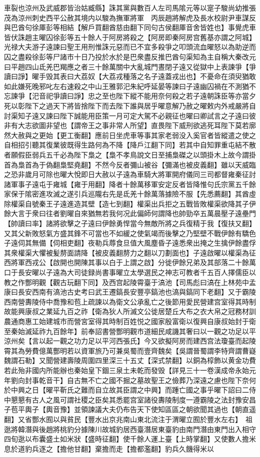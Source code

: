 車裂也涼州及武威郡皆治姑臧縣】誅其黨與數百人左司馬隂元等以寔子駿尚幼推張茂為涼州刺史西平公赦其境内以駿為撫軍將軍　丙辰趙將解虎及長水校尉尹車謀反與巴酋句徐厙彭等相結【解戶買翻酋慈由翻下同句古侯翻厙音舍皆姓也】事覺虎車皆伏誅趙主曜囚徐彭等五十餘人于阿房將殺之【阿房即秦阿房宫舊基亦謂之阿城】光禄大夫游子遠諫曰聖王用刑惟誅元惡而已不宜多殺爭之叩頭流血曜怒以為助逆而囚之盡殺徐彭等尸諸市十日乃投於水於是巴衆盡反推巴酋句渠知為主自稱大秦改元曰平趙四山氐羌巴羯應之者三十餘萬關中大亂城門晝閉子遠又從獄中上表諫爭【爭讀曰諍】曜手毁其表曰大荔奴【大荔戎種落之名子遠蓋戎出也】不憂命在須臾猶敢如此嫌死晚邪叱左右速殺之中山王雅郭汜朱紀呼延晏等諫曰子遠幽囚禍在不測猶不忘諫爭【汜音祀爭讀曰諍】忠之至也陛下縱不能用奈何殺之若子遠朝誅臣等亦當夕死以彰陛下之過天下將皆捨陛下而去陛下誰與居乎曜意解乃赦之曜敕内外戒嚴將自討渠知子遠又諫曰陛下誠能用臣策一月可定大駕不必親征也曜曰卿試言之子遠曰彼非有大志欲圖非望也【謂帝王之事非常人所望】直畏陛下威刑欲逃死耳陛下莫若廓然大赦與之更始【更工衡翻】應前日坐虎車等事其家老弱没入奚官者皆縱遣之使之自相招引聽其復業彼既得生路何為不降【降戶江翻下同】若其中自知罪重屯結不散者願假臣弱兵五千必為陛下梟之【梟不孝鳥說文日至捕梟磔之以頭掛木上故今謂掛首為梟首為于偽翻梟堅堯翻】不然今反者彌山被谷【彌滿也被皮義翻】雖以天威臨之恐非歲月可除也曜大悅即日大赦以子遠為車騎大將軍開府儀同三司都督雍秦征討諸軍事子遠屯于雍城【雍于用翻】降者十餘萬移軍安定反者皆降惟句氏宗黨五千餘家保于隂密進攻滅之遂引兵巡隴右先是氐羌十餘萬落據險不服【先悉薦翻】其酋虛除權渠自號秦王子遠進造其壁【造七到翻】權渠出兵拒之五戰皆敗權渠欲降其子伊餘大言于衆曰往者劉曜自來猶無若我何况此偏師何謂降也帥勁卒五萬晨壓子遠壘門【帥讀曰率】諸將欲擊之子遠曰伊餘勇悍當今無敵所將之兵復精于我【復扶又翻】又其父新敗怒氣方盛其鋒不可當也不如緩之使氣竭而後擊之乃堅壁不戰伊餘有驕色子遠伺其無備【伺相吏翻】夜勒兵蓐食旦值大風塵昏子遠悉衆出掩之生擒伊餘盡俘其衆權渠大懼被髪剺面請降【被皮義翻剺力之翻以刀劃面也】子遠啟曜以權渠為征西將軍西戎公【啟開也開陳其事以白于上謂之啟】分徙伊餘兄弟及其部落二十餘萬口于長安曜以子遠為大司徒録尚書事曜立太學選民之神志可教者千五百人擇儒臣以教之作酆明觀【觀古玩翻下同】及西宫起陵霄臺于滈池【司馬彪曰滈在上林苑中孟康曰長安西南有滈池古史考曰武王遷鎬長安豐亭鎬池也滈與鎬同下老翻】又于霸陵西南營夀陵侍中喬豫和苞上疏諫以為衛文公承亂亡之後節用愛民營建宫室得其時制故能興康叔之業延九百之祚【衛為狄人所滅文公徙居楚丘大布之衣大帛之冠務材訓農通商惠工始建城市而營宮室得其時制百姓悦之國家殷富衛以復興自康叔始封于衛至秦始滅延祚九百餘年】前奉詔書營酆明觀市道細民咸譏其奢曰以一觀之功足以平涼州矣【言以起一觀之功力足以平河西張氏】今又欲擬阿房而建西宫法瓊臺而起陵霄其為勞費億萬酆明若以資軍旅乃可兼吳蜀而壹齊魏矣【吳謂晉蜀謂李特齊謂曹嶷魏謂石勒】又聞營建壽陵周圍四里深三十五丈【深式禁翻】以銅為椁飾以黄金功費若此殆非國内所能辦也秦始皇下錮三泉土未乾而發毁【詳見三十一卷漢成帝永始元年劉向封事乾音干】自古無不亡之國不掘之墓故聖王之儉葬乃深遠之慮也陛下奈何於中興之日【曜平靳氏之難而自立故其臣謂之中興】而踵亡國之事乎曜下詔曰二侍中懇懇有古人之風可謂社稷之臣矣其悉罷宫室諸役夀陵制度一遵霸陵之法封豫安昌子苞平輿子【輿音豫】並領諫議大夫仍布告天下使知區區之朝欲聞其過也【朝直遥翻】又省酆水囿以與貧民【豐水出京兆南山東北流注于渭曜立囿於豐水左右】　祖逖將韓潛與後趙將桃豹分據陳川故城豹居西臺潛居東臺豹由南門潛由東門出入相守四旬逖以布囊盛土如米狀【盛時征翻】使千餘人運上臺【上時掌翻】又使數人擔米息於道豹兵逐之【擔他甘翻】棄擔而走【擔都濫翻】豹兵久饑得米以